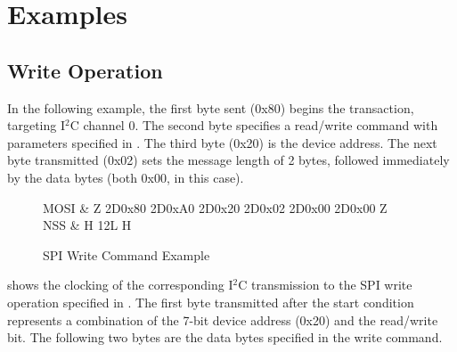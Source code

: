 \section{Examples}


\subsection{Write Operation}

In the following example, the first byte sent (0x80) begins the transaction, targeting I$^2$C channel 0. The second byte specifies a read/write command with parameters specified in . The third byte (0x20) is the device address. The next byte transmitted (0x02) sets the message length of 2 bytes, followed immediately by the data bytes (both 0x00, in this case).

\begin{figure}
\centering
	\begin{tikztimingtable}[
		xscale=2.0,
		yscale=1.5,
		timing/name/.style={font=\normalfont},
		timing/table/header/.style={font=\normalfont},
		timing/x/.style={black},
		timing/z/.style={black},
		timing/slope=0.2,
		timing/c/no arrows,
		timing/c/arrow tip=stealth,
		timing/c/arrow pos=0.75,
	    	]
    	MOSI 		& Z 2D{0x80} 2D{0xA0} 2D{0x20} 2D{0x02} 2D{0x00} 2D{0x00} Z\\
	NSS		& H 12{L} H \\
    \end{tikztimingtable}
    \caption{SPI Write Command Example}
    \label{fig:spiwritecommand}
\end{figure}


 shows the clocking of the corresponding I$^2$C transmission to the SPI write operation specified in . The first byte transmitted after the start condition represents a combination of the 7-bit device address (0x20) and the read/write bit. The following two bytes are the data bytes specified in the write command.

